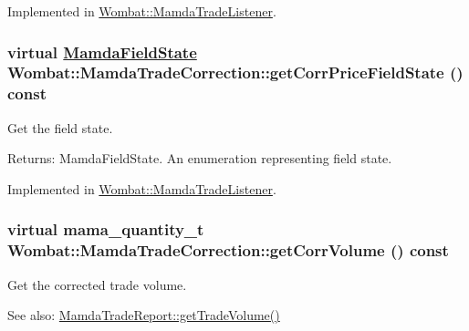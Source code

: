 Implemented in \hyperlink{classWombat_1_1MamdaTradeListener_221a0761538521f3ea2aea124541d07f}{Wombat::Mamda\-Trade\-Listener}.\hypertarget{classWombat_1_1MamdaTradeCorrection_16c47d622b0ed701f3f1fad4a9219a57}{
\subsubsection[getCorrPriceFieldState]{\setlength{\rightskip}{0pt plus 5cm}virtual \hyperlink{namespaceWombat_93aac974f2ab713554fd12a1fa3b7d2a}{Mamda\-Field\-State} Wombat::Mamda\-Trade\-Correction::get\-Corr\-Price\-Field\-State () const}}
\label{classWombat_1_1MamdaTradeCorrection_16c47d622b0ed701f3f1fad4a9219a57}


Get the field state. 

\begin{Desc}
\item[Returns:]Mamda\-Field\-State. An enumeration representing field state. \end{Desc}


Implemented in \hyperlink{classWombat_1_1MamdaTradeListener_08793314284873b5ff94b2f94934cb0b}{Wombat::Mamda\-Trade\-Listener}.\hypertarget{classWombat_1_1MamdaTradeCorrection_39f75a7442d2c2a507f491b323536eaf}{
\subsubsection[getCorrVolume]{\setlength{\rightskip}{0pt plus 5cm}virtual mama\_\-quantity\_\-t Wombat::Mamda\-Trade\-Correction::get\-Corr\-Volume () const}}
\label{classWombat_1_1MamdaTradeCorrection_39f75a7442d2c2a507f491b323536eaf}


Get the corrected trade volume. 

\begin{Desc}
\item[See also:]\hyperlink{classWombat_1_1MamdaTradeReport_167dd8f71093494ce5d0ff7a85739cbf}{Mamda\-Trade\-Report::get\-Trade\-Volume()} \end{Desc}


